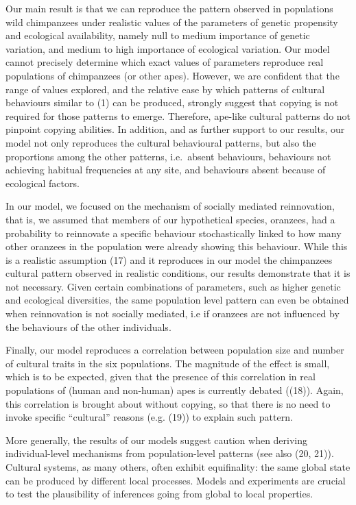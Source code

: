 \documentclass[9pt,twocolumn,twoside,]{pnas-new}
\begin{document}
Our main result is that we can reproduce the pattern observed in
populations wild chimpanzees under realistic values of the parameters of
genetic propensity and ecological availability, namely null to medium
importance of genetic variation, and medium to high importance of
ecological variation. Our model cannot precisely determine which exact
values of parameters reproduce real populations of chimpanzees (or other
apes). However, we are confident that the range of values explored, and
the relative ease by which patterns of cultural behaviours similar to
(1) can be produced, strongly suggest that copying is not required for
those patterns to emerge. Therefore, ape-like cultural patterns do not
pinpoint copying abilities. In addition, and as further support to our
results, our model not only reproduces the cultural behavioural
patterns, but also the proportions among the other patterns, i.e.~absent
behaviours, behaviours not achieving habitual frequencies at any site,
and behaviours absent because of ecological factors.

In our model, we focused on the mechanism of socially mediated
reinnovation, that is, we assumed that members of our hypothetical
species, oranzees, had a probability to reinnovate a specific behaviour
stochastically linked to how many other oranzees in the population were
already showing this behaviour. While this is a realistic assumption
(17) and it reproduces in our model the chimpanzees cultural pattern
observed in realistic conditions, our results demonstrate that it is not
necessary. Given certain combinations of parameters, such as higher
genetic and ecological diversities, the same population level pattern
can even be obtained when reinnovation is not socially mediated, i.e if
oranzees are not influenced by the behaviours of the other individuals.

Finally, our model reproduces a correlation between population size and
number of cultural traits in the six populations. The magnitude of the
effect is small, which is to be expected, given that the presence of
this correlation in real populations of (human and non-human) apes is
currently debated ((18)). Again, this correlation is brought about
without copying, so that there is no need to invoke specific
``cultural'' reasons (e.g. (19)) to explain such pattern.

More generally, the results of our models suggest caution when deriving
individual-level mechanisms from population-level patterns (see also
(20, 21)). Cultural systems, as many others, often exhibit equifinality:
the same global state can be produced by different local processes.
Models and experiments are crucial to test the plausibility of
inferences going from global to local properties.
\end{document}
